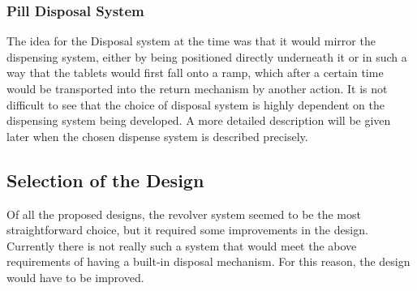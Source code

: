 \subsubsection{Pill Disposal System}
The idea for the Disposal system at the time was that it would mirror the dispensing system, either by being positioned directly underneath it or in such a way that the tablets would first fall onto a ramp, which after a certain time would be transported into the return mechanism by another action. It is not difficult to see that the choice of disposal system is highly dependent on the dispensing system being developed. A more detailed description will be given later when the chosen dispense system is described precisely.

\newpage
\subsection{Selection of the Design}
Of all the proposed designs, the revolver system seemed to be the most straightforward choice, but it required some improvements in the design. Currently there is not really such a system that would meet the above requirements of having a built-in disposal mechanism. For this reason, the design would have to be improved.
